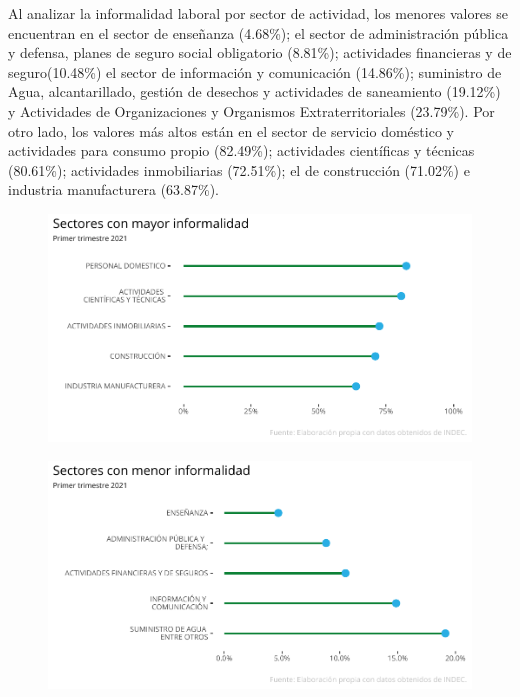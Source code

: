 \documentclass{article}
\begin{document}
\newpage
Al analizar la informalidad laboral por sector de actividad, los menores
valores se encuentran en el sector de enseñanza (4.68\%); el sector de
administración pública y defensa, planes de seguro social obligatorio
(8.81\%); actividades financieras y de seguro(10.48\%) el sector de
información y comunicación (14.86\%); suministro de Agua,
alcantarillado, gestión de desechos y actividades de saneamiento
(19.12\%) y Actividades de Organizaciones y Organismos
Extraterritoriales (23.79\%). Por otro lado, los valores más altos están
en el sector de servicio doméstico y actividades para consumo propio
(82.49\%); actividades científicas y técnicas (80.61\%); actividades
inmobiliarias (72.51\%); el de construcción (71.02\%) e industria
manufacturera (63.87\%).


\begin{figure}
\includegraphics{Informe-Mercado-Laboral_files/figure-latex/unnamed-chunk-40-1.pdf}
\caption{} 
\end{figure}
\begin{figure}
\includegraphics{Informe-Mercado-Laboral_files/figure-latex/unnamed-chunk-41-1.pdf}
\caption{} 
\end{figure}
\end{document}

